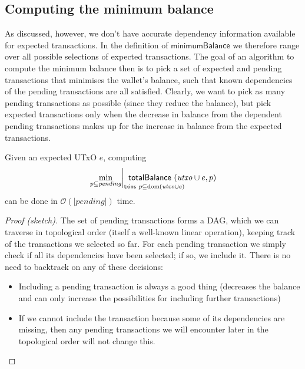 \documentclass{article}
\newcommand{\order}[1]{\mathcal{O}\left(#1\right)}
\DeclareMathOperator{\dom}{dom}
\DeclareMathOperator*{\minimum}{min}
\theoremstyle{definition}{
  \newtheorem{lemma}{Lemma}[section] %
  \newtheorem{definition}[lemma]{Definition}
}
\theoremstyle{theorem}{
  \newtheorem{invariant}[lemma]{Invariant}
  \newtheorem{proofobligation}[lemma]{Proof Obligation}
}
\numberwithin{equation}{lemma}
\begin{document}
\subsection{Computing the minimum balance}

As discussed, however, we don't have accurate dependency information available
for expected transactions. In the definition of $\mathsf{minimumBalance}$ we
therefore range over all possible selections of expected transactions.
The goal of an algorithm to compute the minimum balance then is to pick a set
of expected and pending transactions that minimises the wallet's balance, such
that known dependencies of the pending transactions are all satisfied.
Clearly, we want to pick as many pending transactions as possible (since they
reduce the balance), but pick expected transactions only when the decrease in
balance from the dependent pending transactions makes up for the increase in
balance from the expected transactions.

\begin{lemma}
Given an expected UTxO $e$, computing
%
\begin{equation*}
  \left.
  \minimum_{p \subseteq \mathit{pending}}
  \right|_{\mathrlap{\mathsf{txins} ~ p \subseteq \dom(\mathit{utxo} \cup e)}}
  ~ \mathsf{totalBalance} ~ (\mathit{utxo} \cup e, p)
\end{equation*}
%
can be done in $\order{|\mathit{pending}|}$ time.
\end{lemma}

\begin{proof}[Proof (sketch)]
The set of pending transactions forms a DAG, which we can traverse in
topological order (itself a well-known linear operation), keeping track of the
transactions we selected so far. For each pending transaction we simply check if
all its dependencies have been selected; if so, we include it. There is no need
to backtrack on any of these decisions:

\begin{itemize}
\item Including a pending transaction is always a good thing (decreases the
balance and can only increase the possibilities for  including further
transactions)
\item If we cannot include the transaction because some of its dependencies
are missing, then any pending transactions we will encounter later in the
topological order will not change this.
\end{itemize}
\end{proof}
\end{document}
